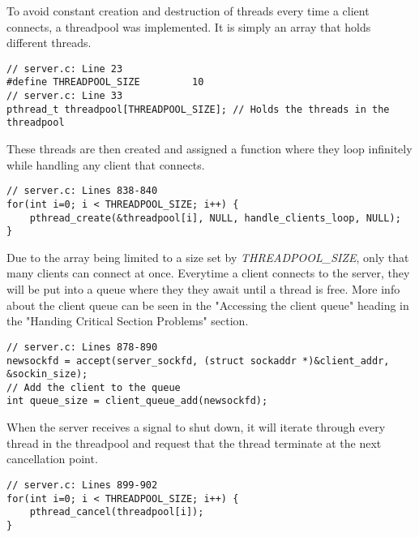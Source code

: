 To avoid constant creation and destruction of threads every time a client connects, a threadpool was implemented. It is simply an array that holds different threads. 
\begin{lstlisting}[style=CStyle]
// server.c: Line 23
#define THREADPOOL_SIZE         10
// server.c: Line 33
pthread_t threadpool[THREADPOOL_SIZE]; // Holds the threads in the threadpool
\end{lstlisting}
These threads are then created and assigned a function where they loop infinitely while handling any client that connects.
\begin{lstlisting}[style=CStyle]
// server.c: Lines 838-840
for(int i=0; i < THREADPOOL_SIZE; i++) {
	pthread_create(&threadpool[i], NULL, handle_clients_loop, NULL);
}
\end{lstlisting}
Due to the array being limited to a size set by \textit{THREADPOOL\_SIZE}, only that many clients can connect at once. Everytime a client connects to the server, they will be put into a queue where they they await until a thread is free. More info about the client queue can be seen in the "Accessing the client queue" heading in the "Handing Critical Section Problems" section.
\begin{lstlisting}[style=CStyle]
// server.c: Lines 878-890
newsockfd = accept(server_sockfd, (struct sockaddr *)&client_addr, &sockin_size);
// Add the client to the queue
int queue_size = client_queue_add(newsockfd);
\end{lstlisting}
When the server receives a signal to shut down, it will iterate through every thread in the threadpool and request that the thread terminate at the next cancellation point.
\begin{lstlisting}[style=CStyle]
// server.c: Lines 899-902
for(int i=0; i < THREADPOOL_SIZE; i++) {
	pthread_cancel(threadpool[i]);
}
\end{lstlisting}